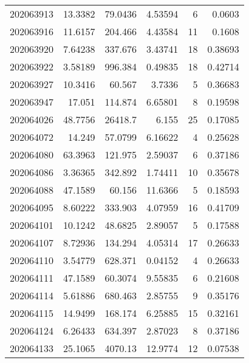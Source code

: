 \begin{tabular}{rrrrrr}
 202063913 &         13.3382  &       79.0436 &            4.53594 &           6 & 0.0603  \\
 202063916 &         11.6157  &      204.466  &            4.43584 &          11 & 0.1608  \\
 202063920 &          7.64238 &      337.676  &            3.43741 &          18 & 0.38693 \\
 202063922 &          3.58189 &      996.384  &            0.49835 &          18 & 0.42714 \\
 202063927 &         10.3416  &       60.567  &            3.7336  &           5 & 0.36683 \\
 202063947 &         17.051   &      114.874  &            6.65801 &           8 & 0.19598 \\
 202064026 &         48.7756  &    26418.7    &            6.155   &          25 & 0.17085 \\
 202064072 &         14.249   &       57.0799 &            6.16622 &           4 & 0.25628 \\
 202064080 &         63.3963  &      121.975  &            2.59037 &           6 & 0.37186 \\
 202064086 &          3.36365 &      342.892  &            1.74411 &          10 & 0.35678 \\
 202064088 &         47.1589  &       60.156  &           11.6366  &           5 & 0.18593 \\
 202064095 &          8.60222 &      333.903  &            4.07959 &          16 & 0.41709 \\
 202064101 &         10.1242  &       48.6825 &            2.89057 &           5 & 0.17588 \\
 202064107 &          8.72936 &      134.294  &            4.05314 &          17 & 0.26633 \\
 202064110 &          3.54779 &      628.371  &            0.04152 &           4 & 0.26633 \\
 202064111 &         47.1589  &       60.3074 &            9.55835 &           6 & 0.21608 \\
 202064114 &          5.61886 &      680.463  &            2.85755 &           9 & 0.35176 \\
 202064115 &         14.9499  &      168.174  &            6.25885 &          15 & 0.32161 \\
 202064124 &          6.26433 &      634.397  &            2.87023 &           8 & 0.37186 \\
 202064133 &         25.1065  &     4070.13   &           12.9774  &          12 & 0.07538 \\

\end{tabular}
